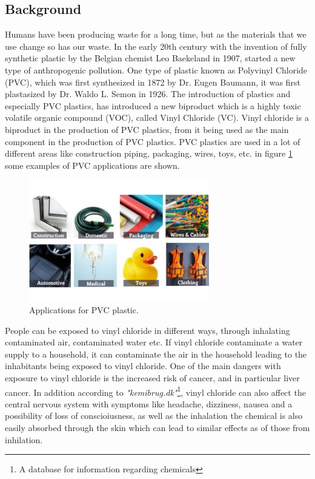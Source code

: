 \documentclass{article}
\begin{document}
\subsection{Background}
Humans have been producing waste for a long time, but as the materials that we use change so has our waste.
In the early 20th century with the invention of fully synthetic plastic by the Belgian chemist Leo Baekeland in 1907\cite{plastic_history}, started a new type of anthropogenic pollution.
One type of plastic known as Polyvinyl Chloride (PVC), which was first synthesized in 1872 by Dr. Eugen Baumann\cite{pvc_origin}, it was first plastasized by Dr. Waldo L. Semon in 1926\cite{history_pvc}.
The introduction of plastics and especially PVC plastics, has introduced a new biproduct which is a highly toxic volatile organic compound (VOC), called Vinyl Chloride (VC).
Vinyl chloride is a biproduct in the production of PVC plastics, from it being used as the main component in the production of PVC plastics.
PVC plastics are used in a lot of different areas like construction piping, packaging, wires, toys, etc. in figure \ref{fig:pvc_applications} some examples of PVC applications are shown.

\begin{figure}[H]
    \centering
    \includegraphics[width=0.7\textwidth]{pvc_applications.jpg}
    \caption{Applications for PVC plastic. \cite{pvc_applications_euroeplas}}
    \label{fig:pvc_applications}
\end{figure}

People can be exposed to vinyl chloride in different ways, through inhalating contaminated air, contaminated water etc.
If vinyl chloride contaminate a water supply to a household, it can contaminate the air in the household leading to the inhabitants being exposed to vinyl chloride. \cite{vc_cancer}
One of the main dangers with exposure to vinyl chloride is the increased risk of cancer, and in particular liver cancer.\cite{vc_cancer}
In addition according to \textit{"kemibrug.dk"}\footnote{A database for information regarding chemicals}, vinyl chloride can also affect the central nervous system with symptoms like headache, dizziness, nausea and a possibility of loss of conscioiusness, as well as the inhalation the chemical is also easily absorbed through the skin which can lead to similar effects as of those from inhilation.\cite{vc_kemibrug}
\end{document}
